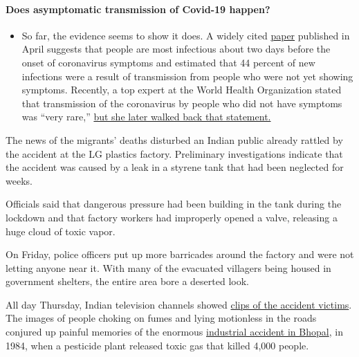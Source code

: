 \begin{itemize}
{  \paragraph{Does asymptomatic transmission of Covid-19
  happen?}\label{does-asymptomatic-transmission-of-covid-19-happen}}

  \begin{itemize}
  \tightlist
  \item
    So far, the evidence seems to show it does. A widely cited
    \href{https://www.nature.com/articles/s41591-020-0869-5}{paper}
    published in April suggests that people are most infectious about
    two days before the onset of coronavirus symptoms and estimated that
    44 percent of new infections were a result of transmission from
    people who were not yet showing symptoms. Recently, a top expert at
    the World Health Organization stated that transmission of the
    coronavirus by people who did not have symptoms was ``very rare,''
    \href{https://www.nytimes.com/2020/06/09/world/coronavirus-updates.html?action=click\&pgtype=Article\&state=default\&region=MAIN_CONTENT_3\&context=storylines_faq\#link-1f302e21}{but
    she later walked back that statement.}
  \end{itemize}
\end{itemize}

The news of the migrants' deaths disturbed an Indian public already
rattled by the accident at the LG plastics factory. Preliminary
investigations indicate that the accident was caused by a leak in a
styrene tank that had been neglected for weeks.

Officials said that dangerous pressure had been building in the tank
during the lockdown and that factory workers had improperly opened a
valve, releasing a huge cloud of toxic vapor.

On Friday, police officers put up more barricades around the factory and
were not letting anyone near it. With many of the evacuated villagers
being housed in government shelters, the entire area bore a deserted
look.

All day Thursday, Indian television channels showed
\href{https://timesofindia.indiatimes.com/city/visakhapatnam/vizag-over-1000-fall-sick-after-gas-leak-from-chemical-plant/articleshow/75590112.cms}{clips
of the accident victims}. The images of people choking on fumes and
lying motionless in the roads conjured up painful memories of the
enormous
\href{https://www.nytimes.com/2008/07/07/world/asia/07bhopal.html}{industrial
accident in Bhopal}, in 1984, when a pesticide plant released toxic gas
that killed 4,000 people.

